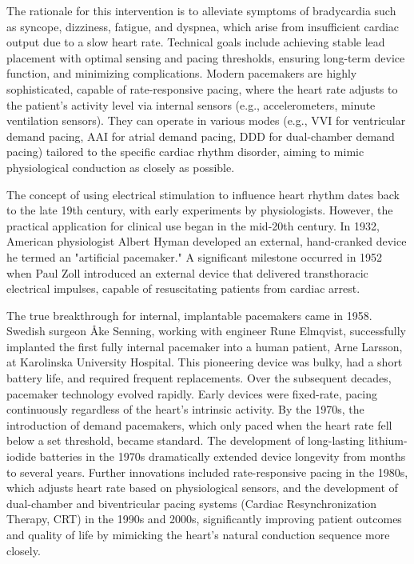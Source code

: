 The rationale for this intervention is to alleviate symptoms of bradycardia such as syncope, dizziness, fatigue, and dyspnea, which arise from insufficient cardiac output due to a slow heart rate. Technical goals include achieving stable lead placement with optimal sensing and pacing thresholds, ensuring long-term device function, and minimizing complications. Modern pacemakers are highly sophisticated, capable of rate-responsive pacing, where the heart rate adjusts to the patient's activity level via internal sensors (e.g., accelerometers, minute ventilation sensors). They can operate in various modes (e.g., VVI for ventricular demand pacing, AAI for atrial demand pacing, DDD for dual-chamber demand pacing) tailored to the specific cardiac rhythm disorder, aiming to mimic physiological conduction as closely as possible.

The concept of using electrical stimulation to influence heart rhythm dates back to the late 19th century, with early experiments by physiologists. However, the practical application for clinical use began in the mid-20th century. In 1932, American physiologist Albert Hyman developed an external, hand-cranked device he termed an "artificial pacemaker." A significant milestone occurred in 1952 when Paul Zoll introduced an external device that delivered transthoracic electrical impulses, capable of resuscitating patients from cardiac arrest.

The true breakthrough for internal, implantable pacemakers came in 1958. Swedish surgeon Åke Senning, working with engineer Rune Elmqvist, successfully implanted the first fully internal pacemaker into a human patient, Arne Larsson, at Karolinska University Hospital. This pioneering device was bulky, had a short battery life, and required frequent replacements. Over the subsequent decades, pacemaker technology evolved rapidly. Early devices were fixed-rate, pacing continuously regardless of the heart's intrinsic activity. By the 1970s, the introduction of demand pacemakers, which only paced when the heart rate fell below a set threshold, became standard. The development of long-lasting lithium-iodide batteries in the 1970s dramatically extended device longevity from months to several years. Further innovations included rate-responsive pacing in the 1980s, which adjusts heart rate based on physiological sensors, and the development of dual-chamber and biventricular pacing systems (Cardiac Resynchronization Therapy, CRT) in the 1990s and 2000s, significantly improving patient outcomes and quality of life by mimicking the heart's natural conduction sequence more closely.

